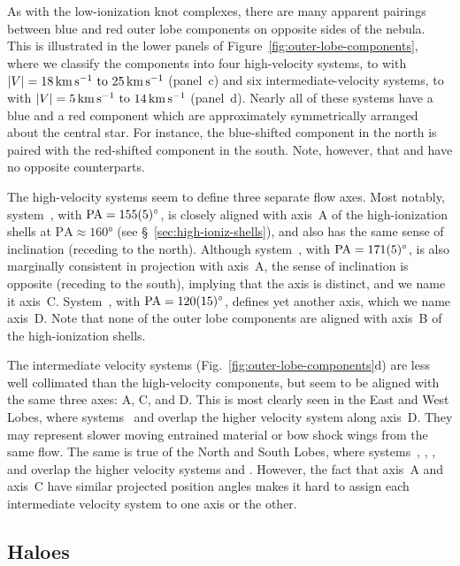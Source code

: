 \documentclass[useAMS, usenatbib]{mnras}
\begin{document}
As with the low-ionization knot complexes,
there are many apparent pairings between blue and red outer lobe components on opposite sides of the nebula.
This is illustrated in the lower panels of Figure~\ref{fig:outer-lobe-components},
where we classify the components into four high-velocity systems,
 to 
with \(|V| = \text{\SIrange{18}{25}{km.s^{-1}}}\) (panel~c)
and six intermediate-velocity systems,
 to 
with \(|V| = \text{\SIrange{5}{14}{km.s^{-1}}}\) (panel~d).
Nearly all of these systems have a blue and a red component
which are approximately symmetrically arranged about the central star.
For instance, the blue-shifted  component in the north
is paired with the red-shifted  component in the south.
Note, however, that  and  have no opposite counterparts.

The high-velocity systems seem to define three separate flow axes.
Most notably, system~, with \(\text{PA} = \ang{155 \pm 5}\),
is closely aligned with axis~A of the high-ionization shells at \(\text{PA} \approx \ang{160}\)
(see \S~\ref{sec:high-ioniz-shells}),
and also has the same sense of inclination (receding to the north).
Although system~, with  \(\text{PA} = \ang{171 \pm 5}\),
is also marginally consistent in projection with axis~A,
the sense of inclination is opposite (receding to the south),
implying that the axis is distinct,
and we name it axis~C.
System~, with  \(\text{PA} = \ang{120 \pm 15}\), defines yet another axis,
which we name axis~D.
Note that none of the outer lobe components are aligned with axis~B of the high-ionization shells.

The intermediate velocity systems (Fig.~\ref{fig:outer-lobe-components}d)
are less well collimated than the high-velocity components,
but seem to be aligned with the same three axes: A, C, and D.
This is most clearly seen in the East and West Lobes,
where systems~ and  overlap the higher velocity system  along axis~D.
They may represent slower moving entrained material or bow shock wings from the same flow.
The same is true of the North and South Lobes,
where systems~, , , and 
overlap the higher velocity systems  and .
However, the fact that axis~A and axis~C have similar projected position angles
makes it hard to assign each intermediate velocity system to one axis or the other.


\subsection{Haloes}
\label{sec:haloes}
\end{document}

